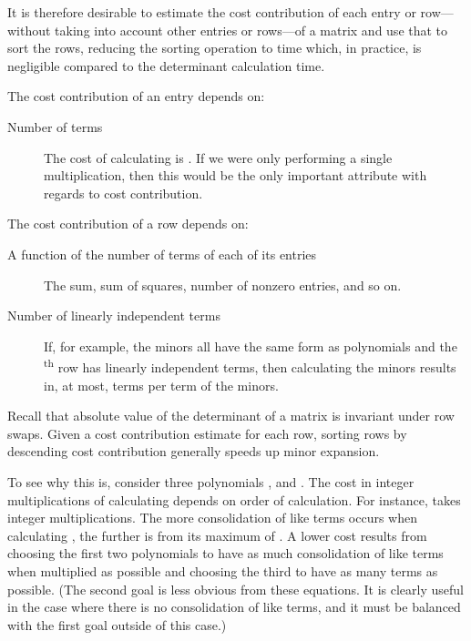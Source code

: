 \documentclass[12pt]{amsart}
\numberwithin{equation}{section}
\numberwithin{figure}{section}
\newcommand{\eq}[2][]{\ifthenelse{\equal{#1}{}}{\eqNoNum{#2}}{\eqNum{\label{#1}
#2}\\}}
\newcommand{\eqNoNum}[1]{}
\newcommand{\eqNum}[2]{}
\newcommand{\xth}{\textsuperscript{th}\xspace}
\newcommand{\cc}{cost contribution\xspace}
\newcommand{\lrparen}[2][1]{\ifthenelse{\equal{#1}{1}}{(#2)}{\left(#2\right)}}
\DeclareMathOperator{\subop}{sub}
\newcommand{\sub}[4][1]{\subop\lrparen[#1]{#2, #3, #4}}
\DeclareMathOperator{\detop}{det}
\renewcommand{\det}[2][1]{\detop\lrparen[#1]{#2}}
\newcommand{\smin}{\setminus}
\newcommand{\nterms}[2][1]{T\lrparen[#1]{#2}}
\begin{document}
It is therefore desirable to estimate the \cc of each entry or row---without taking into account other entries or rows---of a matrix and use that to sort the rows, reducing the sorting operation to  time which, in practice, is negligible compared to the determinant calculation time.

\begin{comment}
[Yes, it would, wouldn't it? I'll introduce \cc. Basic idea: although we can precisely define the \cc of matrix  as the total cost in integer multiplications of doing minor expansion, which is
\eq{
\sum_{J \subseteq [n]}\sum_{j \in J}\nterms{a_{|J|j}}\nterms{\det{\sub{A}{[|J|-1]}{J \smin \{j\}}}},
}
defining it for an individual row or entry is more useful but much harder. For example, it might not be possible to assign a single \cc to a row because it may be dependent on the placement of other rows.]
\end{comment}

The \cc of an entry depends on:
\begin{description}
\item[Number of terms] The cost of calculating  is . If we were only performing a single multiplication, then this would be the only important attribute with regards to \cc.
\begin{comment}
\item[Frequency of its variables in other rows and columns] When multiplying polynomials that share a variable, consolidation of like terms reduces the number of terms in the product, making subsequent multiplications less costly.
\end{comment}
\end{description}
The \cc of a row depends on:
\begin{description}
\item[A function of the number of terms of each of its entries] The sum, sum of squares, number of nonzero entries, and so on.
\item[Number of linearly independent terms] If, for example, the  minors all have the same form as polynomials and the \xth row has  linearly independent terms, then calculating the  minors results in, at most,  terms per term of the  minors.
\end{description}

Recall that absolute value of the determinant of a matrix is invariant under row swaps. Given a \cc estimate for each row, sorting rows by descending \cc generally speeds up minor expansion.

To see why this is, consider three polynomials ,  and . The cost in integer multiplications of calculating  depends on order of calculation. For instance,  takes  integer multiplications. The more consolidation of like terms occurs when calculating , the further  is from its maximum of . A lower cost results from choosing the first two polynomials to have as much consolidation of like terms when multiplied as possible and choosing the third to have as many terms as possible. (The second goal is less obvious from these equations. It is clearly useful in the case where there is no consolidation of like terms, and it must be balanced with the first goal outside of this case.)
\end{document}
